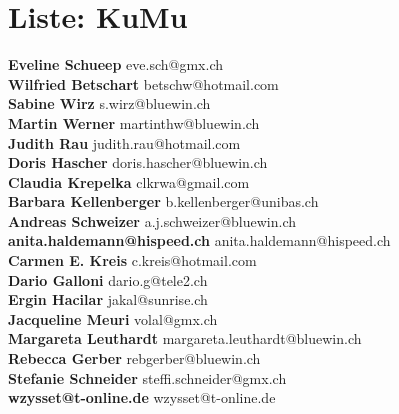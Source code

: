 \documentclass{scrartcl}
\begin{document}
\section*{Liste: KuMu}
\textbf{Eveline Schueep } eve.sch@gmx.ch\\
\textbf{Wilfried Betschart } betschw@hotmail.com\\
\textbf{Sabine Wirz } s.wirz@bluewin.ch\\
\textbf{Martin Werner } martinthw@bluewin.ch\\
\textbf{Judith Rau } judith.rau@hotmail.com\\
\textbf{Doris Hascher } doris.hascher@bluewin.ch\\
\textbf{Claudia Krepelka } clkrwa@gmail.com\\
\textbf{Barbara Kellenberger } b.kellenberger@unibas.ch\\
\textbf{Andreas Schweizer } a.j.schweizer@bluewin.ch\\
\textbf{anita.haldemann@hispeed.ch } anita.haldemann@hispeed.ch\\
\textbf{Carmen E. Kreis } c.kreis@hotmail.com\\
\textbf{Dario Galloni } dario.g@tele2.ch\\
\textbf{Ergin Hacilar } jakal@sunrise.ch\\
\textbf{Jacqueline Meuri } volal@gmx.ch\\
\textbf{Margareta Leuthardt } margareta.leuthardt@bluewin.ch\\
\textbf{Rebecca Gerber } rebgerber@bluewin.ch\\
\textbf{Stefanie Schneider } steffi.schneider@gmx.ch\\
\textbf{wzysset@t-online.de } wzysset@t-online.de\\
\end{document}
